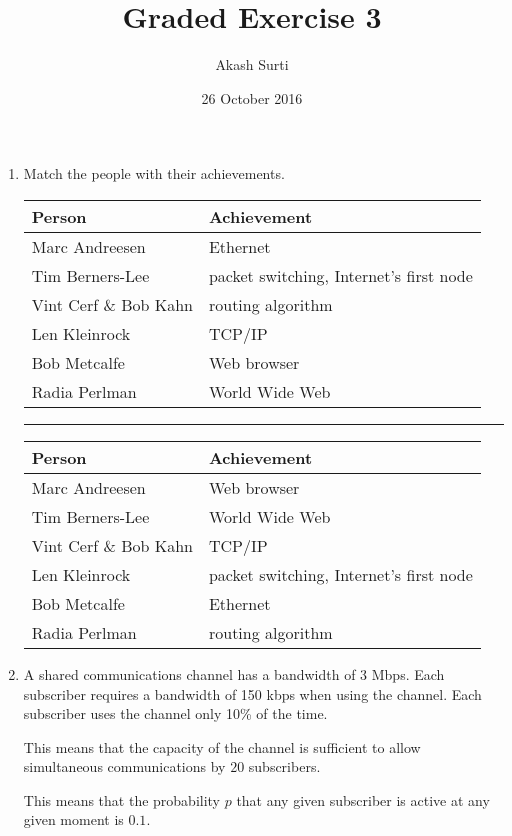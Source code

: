 \documentclass[twoside]{article}
\title{Graded Exercise 3}
\author{Akash Surti}
\date{26 October 2016}
\newenvironment{answer}
  {\vspace*{0.2cm} \rule{12cm}{0.04cm} \vspace*{0.2cm}}
  {\vspace*{0.2cm}}
\begin{document}
\maketitle

\begin{enumerate}
  \item Match the people with their achievements.

  \begin{tabular}{l|l}
    \textbf{Person} & \textbf{Achievement} \\ \hline
    Marc Andreesen & Ethernet \\
    Tim Berners-Lee & packet switching, Internet's first node \\
    Vint Cerf \& Bob Kahn & routing algorithm \\    
    Len Kleinrock & TCP/IP \\
    Bob Metcalfe & Web browser \\
    Radia Perlman & World Wide Web
    \end{tabular}

  \begin{answer}

  \begin{tabular}{l|l}
    \textbf{Person} & \textbf{Achievement} \\ \hline
    Marc Andreesen & Web browser \\
    Tim Berners-Lee &  World Wide Web \\
    Vint Cerf \& Bob Kahn & TCP/IP \\    
    Len Kleinrock & packet switching, Internet's first node \\
    Bob Metcalfe & Ethernet \\
    Radia Perlman & routing algorithm
    \end{tabular}

    \end{answer}

  \item A shared communications channel has a bandwidth of 3 Mbps.
    Each subscriber requires a bandwidth of 150 kbps when
    using the channel.
    Each subscriber uses the channel only 10\% of the time.

    This means that the capacity of the channel is sufficient to
    allow simultaneous communications by $20$ subscribers.

    This means that the probability $p$ that any given subscriber is active at any given moment
    is $0.1$.


\end{enumerate}
\end{document}
